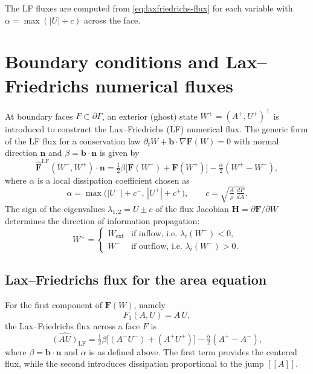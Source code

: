 \documentclass[11pt]{article}
\newcommand{\jump}[1]{\left[\!\left[#1\right]\!\right]}
\begin{document}
The LF fluxes are computed from \eqref{eq:laxfriedrichs-flux} for each
variable with $\alpha = \max(|U|+c)$ across the face.

 

\section{Boundary conditions and Lax--Friedrichs numerical fluxes}

At boundary faces $F\subset\partial\Gamma$, an exterior (ghost) state
$W^+ = (A^+,U^+)^\top$ is introduced to construct the Lax--Friedrichs (LF)
numerical flux. The generic form of the LF flux for a conservation law
$\partial_t W + \bm b\!\cdot\!\nabla \mathbf{F}(W) = 0$
with normal direction $\bm n$ and $\beta=\bm b\!\cdot\!\bm n$
is given by
\begin{equation}
  \widehat{\mathbf{F}}^{\text{LF}}(W^-,W^+)\cdot\bm n
  = \tfrac12\beta\big[\mathbf{F}(W^-)+\mathbf{F}(W^+)\big]
    - \tfrac{\alpha}{2}(W^+ - W^-),
  \label{eq:LF-flux-general}
\end{equation}
where $\alpha$ is a local dissipation coefficient chosen as
\[
  \alpha = \max\big(|U^-|+c^-,\,|U^+|+c^+\big),
  \qquad
  c = \sqrt{\tfrac{A}{\rho}\,\tfrac{dP}{dA}} .
\]
The sign of the eigenvalues $\lambda_{1,2} = U \pm c$ of the flux Jacobian
$\mathbf{H}=\partial\mathbf{F}/\partial W$
determines the direction of information propagation:
\[
W^+ =
\begin{cases}
  W_{\text{ext}} & \text{if inflow, i.e. } \lambda_i(W^-)\!<\!0,\\[2pt]
  W^- & \text{if outflow, i.e. } \lambda_i(W^-)\!>\!0.
\end{cases}
\]

\subsection*{Lax--Friedrichs flux for the area equation}
For the first component of $\mathbf{F}(W)$, namely
\[
  F_1(A,U) = A\,U ,
\]
the Lax--Friedrichs flux across a face $F$ is
\begin{equation}
  \widehat{(A U)}_{\text{LF}}
  = \tfrac12\beta\big[(A^-U^-)+(A^+U^+)\big]
   - \tfrac{\alpha}{2}(A^+ - A^-),
  \label{eq:LF-flux-AU}
\end{equation}
where $\beta=\bm b\!\cdot\!\bm n$ and $\alpha$ is as defined above.
The first term provides the centered flux, while the second introduces
dissipation proportional to the jump $\jump{A}$.
\end{document}
